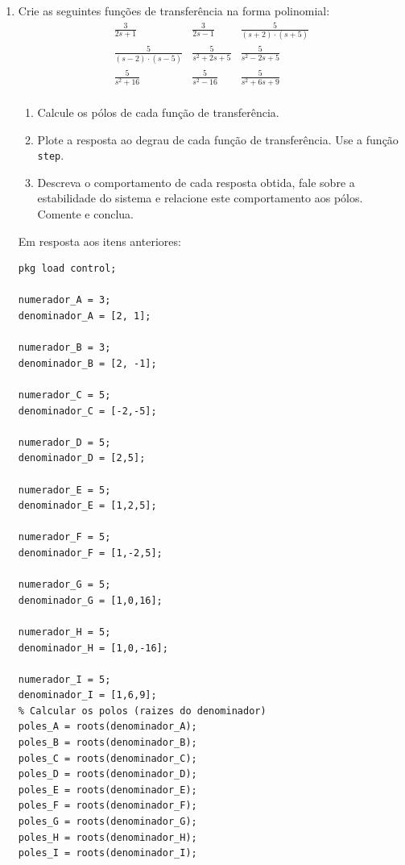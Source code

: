 \documentclass[a4paper,12pt]{article}
\begin{document}
    \begin{enumerate}
        \item Crie as seguintes funções de transferência na forma polinomial:
        \[
            \begin{array}{ccc}
                \frac{3}{2s + 1} & \frac{3}{2s - 1} & \frac{5}{(s + 2) \cdot (s + 5)} \\
                \frac{5}{(s - 2) \cdot (s - 5)} & \frac{5}{s^2 + 2s + 5} & \frac{5}{s^2 - 2s + 5} \\
                \frac{5}{s^2 + 16} & \frac{5}{s^2 - 16} & \frac{5}{s^2 + 6s + 9} \\
            \end{array}
        \]

        \begin{enumerate}
            \item Calcule os pólos de cada função de transferência.
            \item Plote a resposta ao degrau de cada função de transferência. Use a função \texttt{step}.
            \item Descreva o comportamento de cada resposta obtida, fale sobre a estabilidade do sistema e relacione este comportamento aos pólos. Comente e conclua.
        \end{enumerate}
        Em resposta aos itens anteriores:
        \vspace{0.5cm}
        \begin{lstlisting}
pkg load control;

numerador_A = 3;
denominador_A = [2, 1];

numerador_B = 3;
denominador_B = [2, -1];

numerador_C = 5;
denominador_C = [-2,-5];

numerador_D = 5;
denominador_D = [2,5];

numerador_E = 5;
denominador_E = [1,2,5];

numerador_F = 5;
denominador_F = [1,-2,5];

numerador_G = 5;
denominador_G = [1,0,16];

numerador_H = 5;
denominador_H = [1,0,-16];

numerador_I = 5;
denominador_I = [1,6,9];
% Calcular os polos (raizes do denominador)
poles_A = roots(denominador_A);
poles_B = roots(denominador_B);
poles_C = roots(denominador_C);
poles_D = roots(denominador_D);
poles_E = roots(denominador_E);
poles_F = roots(denominador_F);
poles_G = roots(denominador_G);
poles_H = roots(denominador_H);
poles_I = roots(denominador_I);


\end{lstlisting}
\end{enumerate}
\end{document}
